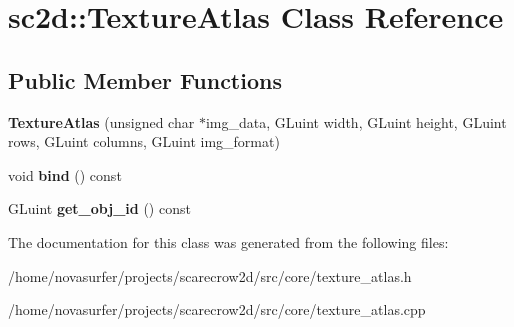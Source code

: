 \hypertarget{classsc2d_1_1TextureAtlas}{}\section{sc2d\+:\+:Texture\+Atlas Class Reference}
\label{classsc2d_1_1TextureAtlas}
\subsection*{Public Member Functions}
\begin{DoxyCompactItemize}
\item 
\mbox{\label{classsc2d_1_1TextureAtlas_a7e0aa19b8e9e13a25cf04387f4bc0ff9}} 
{\bfseries Texture\+Atlas} (unsigned char $\ast$img\+\_\+data, G\+Luint width, G\+Luint height, G\+Luint rows, G\+Luint columns, G\+Luint img\+\_\+format)
\item 
\mbox{\label{classsc2d_1_1TextureAtlas_a7936963dc3a6e8334d07bcaf0d514439}} 
void {\bfseries bind} () const
\item 
\mbox{\label{classsc2d_1_1TextureAtlas_af442ca460381b9c13d8880d1fac06da7}} 
G\+Luint {\bfseries get\+\_\+obj\+\_\+id} () const
\end{DoxyCompactItemize}


The documentation for this class was generated from the following files\+:\begin{DoxyCompactItemize}
\item 
/home/novasurfer/projects/scarecrow2d/src/core/texture\+\_\+atlas.\+h\item 
/home/novasurfer/projects/scarecrow2d/src/core/texture\+\_\+atlas.\+cpp\end{DoxyCompactItemize}
